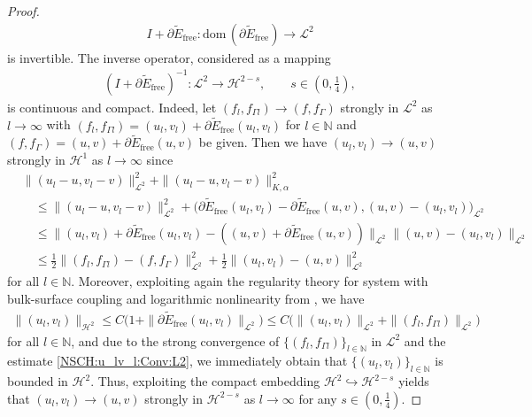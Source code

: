 \documentclass[11pt,reqno]{amsart}
\theoremstyle{remark}
\numberwithin{equation}{section}
\newcommand{\norm}[1]{\| #1 \|}
\newcommand{\bigscp}[2]{\big( #1 , #2 \big)}
\newcommand{\N}{\mathbb N}
\newcommand{\del}{\partial}
\newcommand{\emb}{\hookrightarrow}
\newcommand{\Ga}{\Gamma}
\newcommand{\free}{\mathrm{free}}
\begin{document}
\begin{proof}
    \begin{align*}
        I + \partial \widetilde E_\free:\mathrm{dom}\,(\partial \widetilde E_\free)\rightarrow\mathcal{L}^2
    \end{align*}
    is invertible. The inverse operator, considered as a mapping
    \begin{align*}
        (I + \partial \widetilde E_\free)^{-1}:\mathcal{L}^2\rightarrow\mathcal{H}^{2-s}, \qquad s\in(0,\tfrac14),
    \end{align*}
    is continuous and compact. Indeed, let $(f_l,f_{\Ga l})\rightarrow (f,f_\Ga)$ strongly in $\mathcal{L}^2$ as $l\rightarrow\infty$ with $(f_l,f_{\Ga l}) = (u_l,v_l) + \partial \widetilde E_\free(u_l,v_l)$ for $l\in\N$ and $(f,f_\Ga) = (u,v) + \partial \widetilde E_\free(u,v)$ be given. Then we have $(u_l,v_l)\rightarrow (u,v)$ strongly in $\mathcal{H}^1$ as $l\rightarrow\infty$ since
    \begin{align}\label{NSCH:u_lv_l:Conv:L2}
        &\norm{(u_l - u, v_l - v)}_{\mathcal{L}^2}^2 + \norm{(u_l - u, v_l - v)}_{K,\alpha}^2 \nonumber \\
        &\quad\leq \norm{(u_l - u, v_l - v)}_{\mathcal{L}^2}^2 + \bigscp{\partial \widetilde E_\free(u_l,v_l) - \partial \widetilde E_\free(u,v)}{(u,v) - (u_l,v_l)}_{\mathcal{L}^2} \nonumber \\
        &\quad\leq \norm{(u_l,v_l) + \partial \widetilde E_\free(u_l,v_l) - ((u,v) + \partial \widetilde E_\free(u,v))}_{\mathcal{L}^2}\norm{(u,v) - (u_l,v_l)}_{\mathcal{L}^2} \nonumber \\
        &\quad\leq \frac12\norm{(f_l,f_{\Ga l}) - (f,f_\Ga)}_{\mathcal{L}^2}^2 + \frac12\norm{(u_l,v_l) - (u,v)}_{\mathcal{L}^2}^2
    \end{align}
    for all $l\in\N$. Moreover, exploiting again the regularity theory for system with bulk-surface coupling and logarithmic nonlinearity from \cite[Proposition~5.1]{Giorgini2026}, we have
    \begin{align}\label{NSCH:u_lv_l:Est:H2}
    	\norm{(u_l,v_l)}_{\mathcal{H}^2} \leq C\big(1 + \norm{\del\widetilde E_\free(u_l,v_l)}_{\mathcal{L}^2}\big) \leq C\big(\norm{(u_l,v_l)}_{\mathcal{L}^2} + \norm{(f_l,f_{\Ga l})}_{\mathcal{L}^2}\big)
    \end{align}
    for all $l\in\N$, and due to the strong convergence of $\{(f_l,f_{\Ga l})\}_{l\in\N}$ in $\mathcal{L}^2$ and the estimate \eqref{NSCH:u_lv_l:Conv:L2}, we immediately obtain that $\{(u_l,v_l)\}_{l\in\N}$ is bounded in $\mathcal{H}^2$. Thus, exploiting the compact embedding $\mathcal{H}^2\emb\mathcal{H}^{2-s}$ yields that $(u_l,v_l)\rightarrow (u,v)$ strongly in $\mathcal{H}^{2-s}$ as $l\rightarrow\infty$ for any $s\in(0,\frac14)$. 
    

\end{proof}
\end{document}
